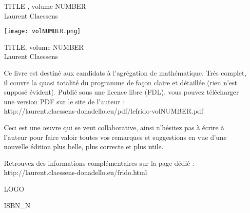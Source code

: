 \documentclass[a4paper,twoside,11pt]{book}
\begin{document}
 

\pagestyle{empty}

\begin{center}
    {\Large TITLE , volume NUMBER }\\
    Laurent Claessens
\end{center}

\vspace{3cm}

\begin{center}
    \texttt{[image: volNUMBER.png]}
\end{center}

\newpage

\noindent
\Large
TITLE, volume NUMBER\\
\noindent
\large
Laurent Claessens

\normalsize

\vspace{4cm}

\noindent
Ce livre est destiné aux candidats à l'agrégation de mathématique. Très complet, il couvre la quasi totalité du programme de façon claire et détaillée (rien n'est supposé évident). Publié sous une licence libre (FDL), vous pouvez télécharger une version PDF sur le site de l'auteur :\\
http://laurent.claessens-donadello.eu/pdf/lefrido-volNUMBER.pdf 

\noindent
Ceci est une œuvre qui se veut collaborative, ainsi n'hésitez pas à écrire à l'auteur pour faire valoir toutes vos remarques et suggestions en vue d'une nouvelle édition plus belle, plus correcte et plus utile.

\noindent
Retrouvez des informations complémentaires sur la page dédié :\\
http://laurent.claessens-donadello.eu/frido.html

\vfill

LOGO

ISBN_N
\end{document}
